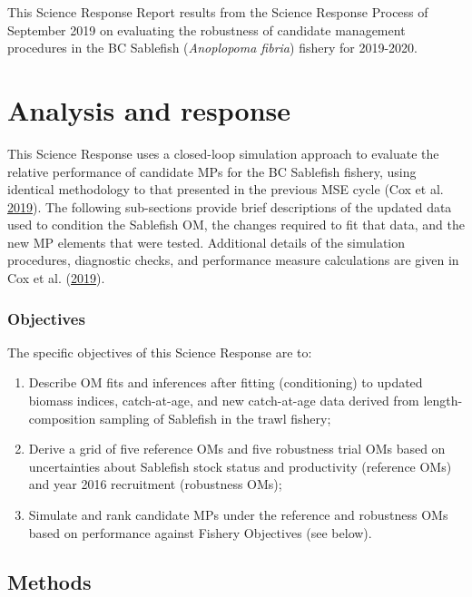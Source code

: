 \documentclass[11pt]{book}
\begin{document}
This Science Response Report results from the Science Response Process of September 2019 on evaluating the robustness of candidate management procedures in the BC Sablefish (\emph{Anoplopoma fibria}) fishery for 2019-2020.

\hypertarget{analysis-and-response}{%
\section{Analysis and response}\label{analysis-and-response}}

This Science Response uses a closed-loop simulation approach to evaluate the relative performance of candidate MPs for the BC Sablefish fishery, using identical methodology to that presented in the previous MSE cycle (Cox et al. \protect\hyperlink{ref-cox2019evaluating}{2019}). The following sub-sections provide brief descriptions of the updated data used to condition the Sablefish OM, the changes required to fit that data, and the new MP elements that were tested. Additional details of the simulation procedures, diagnostic checks, and performance measure calculations are given in Cox et al. (\protect\hyperlink{ref-cox2019evaluating}{2019}).

\hypertarget{objectives}{%
\subsubsection{Objectives}\label{objectives}}

The specific objectives of this Science Response are to:
\begin{enumerate}
\def\labelenumi{\arabic{enumi}.}

\item
  Describe OM fits and inferences after fitting (conditioning) to updated biomass indices, catch-at-age, and new catch-at-age data derived from length-composition sampling of Sablefish in the trawl fishery;
\item
  Derive a grid of five reference OMs and five robustness trial OMs based on uncertainties about Sablefish stock status and productivity (reference OMs) and year 2016 recruitment (robustness OMs);
\item
  Simulate and rank candidate MPs under the reference and robustness OMs based on performance against Fishery Objectives (see below).
\end{enumerate}
\hypertarget{methods}{%
\subsection{Methods}\label{methods}}
\end{document}
